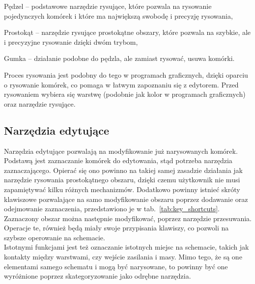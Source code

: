 \begin{citemize}
    \item Pędzel -- podstawowe narzędzie rysujące, które pozwala na rysowanie pojedynczych komórek
    i które ma największą swobodę i precyzję rysowania,
    \item Prostokąt -- narzędzie rysujące prostokątne obszary, które pozwala na szybkie,
    ale i precyzyjne rysowanie dzięki dwóm trybom,
    \item Gumka -- działanie podobne do pędzla, ale zamiast rysować, usuwa komórki.
\end{citemize}

\indent Proces rysowania jest podobny do tego w programach graficznych,
dzięki oparciu o rysowanie komórek, co pomaga w łatwym zapoznaniu się z edytorem.
Przed rysowaniem wybiera się warstwę (podobnie jak kolor w programach graficznych) oraz narzędzie rysujące.

\subsection{Narzędzia edytujące}
\label{subsec:narzedzia_edytujace}

Narzędzia edytujące pozwalają na modyfikowanie już narysowanych komórek.
Podstawą jest zaznaczanie komórek do edytowania,
stąd potrzeba narzędzia zaznaczającego.
Opierać się ono powinno na takiej samej zasadzie działania jak narzędzie rysowania prostokątnego obszaru,
dzięki czemu użytkownik nie musi zapamiętywać kilku różnych mechanizmów.
Dodatkowo powinny istnieć skróty klawiszowe pozwalające na samo modyfikowanie obszaru poprzez dodawanie
oraz odejmowanie zaznaczenia, przedstawiono je w tab.~\ref{tab:key_shortcuts}.
Zaznaczony obszar można następnie modyfikować, poprzez narzędzie przesuwania.
Operacje te, również będą miały swoje przypisania klawiszy, co pozwoli na szybsze operowanie na schemacie. \\
\indent Istotnymi funkcjami jest też oznaczanie istotnych miejsc na schemacie, takich jak kontakty między warstwami,
czy wejście zasilania i masy.
Mimo tego, że są one elementami samego schematu i mogą być narysowane,
to powinny być one wyróżnione poprzez skategoryzowanie jako odrębne narzędzia.

